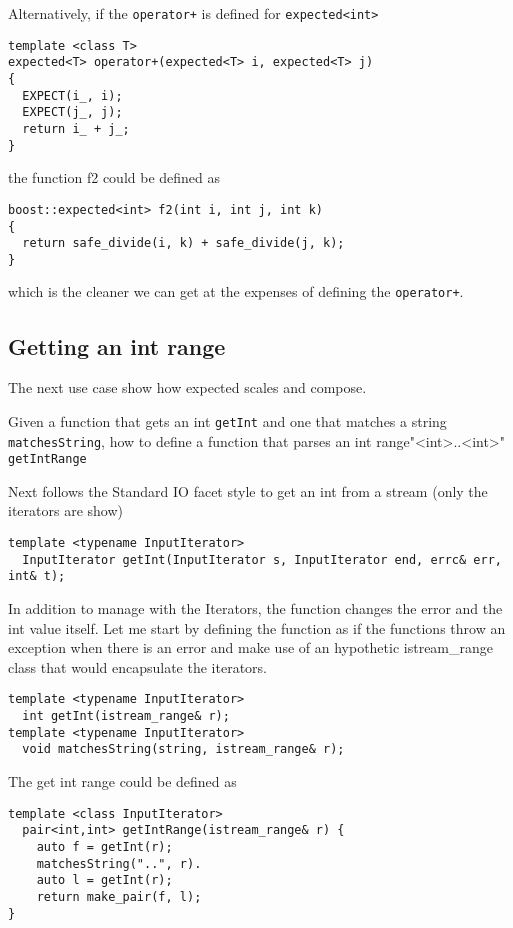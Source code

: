 \documentclass[a4paper,10pt]{article}
\newcommand{\cpp}[1]{\lstinline{#1}}
\begin{document}
Alternatively, if the \cpp{operator+} is defined for \cpp{expected<int>}

\begin{lstlisting}
template <class T>
expected<T> operator+(expected<T> i, expected<T> j)
{
  EXPECT(i_, i);
  EXPECT(j_, j);
  return i_ + j_;
}
\end{lstlisting}

the function f2 could be defined as

\begin{lstlisting}
boost::expected<int> f2(int i, int j, int k)
{
  return safe_divide(i, k) + safe_divide(j, k);
}
\end{lstlisting}

which is the cleaner we can get at the expenses of defining the \cpp{operator+}.


\subsection{Getting an int range}

The next use case show how expected scales and compose. 

Given a function that gets an int \cpp{getInt} and one that matches a string \cpp{matchesString}, how to define a function that parses an int range"<int>..<int>" \cpp{getIntRange}

Next follows the Standard IO facet style to get an int from a stream (only the iterators are show)

\begin{lstlisting}
template <typename InputIterator>
  InputIterator getInt(InputIterator s, InputIterator end, errc& err, int& t);
\end{lstlisting}

In addition to manage with the Iterators, the function changes the error and the int value itself. Let me start by defining the function as if the functions throw an exception when there is an error and make use of an hypothetic istream_range class that would encapsulate the iterators. 

\begin{lstlisting}
template <typename InputIterator>
  int getInt(istream_range& r);
template <typename InputIterator>
  void matchesString(string, istream_range& r);
\end{lstlisting}

The get int range could be defined as

\begin{lstlisting}
template <class InputIterator>
  pair<int,int> getIntRange(istream_range& r) {
    auto f = getInt(r);
    matchesString("..", r).
    auto l = getInt(r);       
    return make_pair(f, l);
}
\end{lstlisting}
\end{document}
